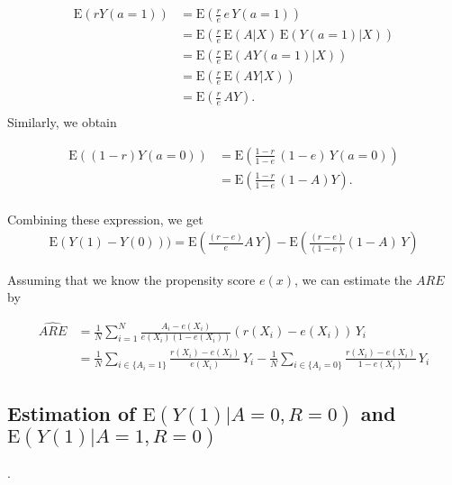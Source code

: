 \documentclass[10pt]{article}
\newcommand{\Esp}{\mbox{E}}
\begin{document}
\begin{align*}
	\Esp(rY(a=1))&= \Esp(\frac{r}{e} \, e \, Y(a=1))\\
	             &= \Esp(\frac{r}{e} \, \Esp(A |X) \, \Esp(Y(a=1)|X))\\
	             &=\Esp(\frac{r}{e} \, \Esp(A Y(a=1)|X))\\
	             &=\Esp(\frac{r}{e} \, \Esp(A Y|X))\\
	             &=\Esp(\frac{r}{e}\,A Y).\\
\end{align*}
 Similarly, we obtain
 
 \begin{align*}
 	\Esp((1-r)Y(a=0))&= \Esp(\frac{1-r}{1-e} \, (1-e) \, Y(a=0))\\
 	&=\Esp(\frac{1-r}{1-e}\,(1-A) Y).\\
 \end{align*}

Combining these expression, we get
\begin{align*}
	\Esp(Y(1)-Y(0)))=\Esp(\frac{(r-e)}{e} A \, Y)-\Esp(\frac{(r-e)}{ (1-e)} (1-A) \, Y)
\end{align*}

Assuming that we know the propensity score $e(x)$, we can estimate the $ARE$ by

\begin{align*}
	\widehat{ARE}&= \frac{1}{N}\sum_{i=1}^{N}\frac{A_i -e(X_i)}{e(X_i)(1-e(X_i))}(r(X_i)-e(X_i)) \, Y_i\\
	&= \frac{1}{N}\sum_{ i \in \{A_i=1\}} \frac{ r(X_i)-e(X_i)}{e(X_i)} \, Y_i-\frac{1}{N}\sum_{ i \in \{A_i=0\}} \frac{ r(X_i)-e(X_i)}{1-e(X_i)} \, Y_i
\end{align*}

\subsection{Estimation of $\Esp(Y(1)|A=0,R=0)$ and $\Esp(Y(1)|A=1,R=0)$}.
\end{document}
